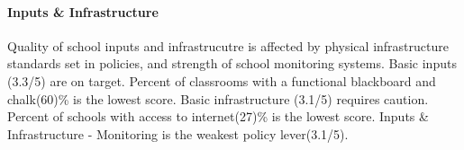 \documentclass[
  twocolumn]{article}
\begin{document}
\hypertarget{inputs-infrastructure}{%
\paragraph{\texorpdfstring{\textbf{Inputs \&
Infrastructure}}{Inputs \& Infrastructure}}\label{inputs-infrastructure}}

Quality of school inputs and infrastrucutre is affected by physical
infrastructure standards set in policies, and strength of school
monitoring systems. Basic inputs (3.3/5) are on target. Percent of
classrooms with a functional blackboard and chalk(60)\% is the lowest
score. Basic infrastructure (3.1/5) requires caution. Percent of schools
with access to internet(27)\% is the lowest score. Inputs \&
Infrastructure - Monitoring is the weakest policy lever(3.1/5).
\end{document}
